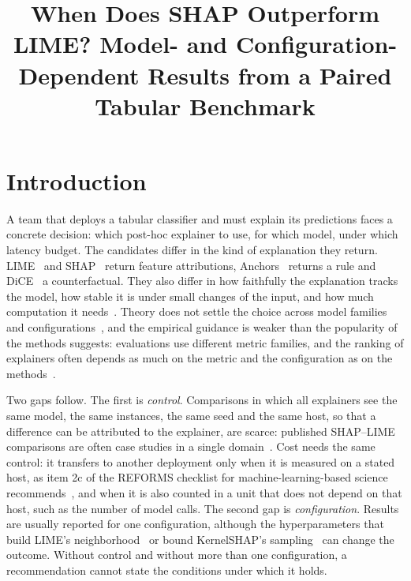 \documentclass[11pt,a4paper]{article}
\title{When Does SHAP Outperform LIME? Model- and Configuration-Dependent
Results from a Paired Tabular Benchmark}
\author{}
\date{}
\begin{document}
\maketitle

\begin{abstract}
\noindent

\end{abstract}


\section{Introduction}
\label{sec:intro}

A team that deploys a tabular classifier and must explain its predictions
faces a concrete decision: which post-hoc explainer to use, for which model,
under which latency budget. The candidates differ in the kind of explanation
they return. LIME~\cite{ribeiro2016why} and SHAP~\cite{lundberg2017unified}
return feature attributions, Anchors~\cite{ribeiro2018anchors} returns a
rule and DiCE~\cite{mothilal2020dice} a counterfactual. They also differ in
how faithfully the explanation tracks the model, how stable it is under
small changes of the input, and how much computation it
needs~\cite{velmurugan2025guidelines,ababneh2026faithfulness,olsen2024comparative}. Theory does
not settle the choice across model families and
configurations~\cite{retzlaff2024posthoc,longo2024manifesto}, and the
empirical guidance is weaker than the popularity of the methods suggests:
evaluations use different metric families, and the ranking of explainers
often depends as much on the metric and the configuration as on the
methods~\cite{nauta2023anecdotal,canha2025benchmark,pawlicki2024metrics}.

Two gaps follow. The first is \emph{control}. Comparisons in which all
explainers see the same model, the same instances, the same seed and the
same host, so that a difference can be attributed to the explainer, are
scarce: published SHAP--LIME comparisons are often case studies in a single
domain~\cite{hooshyar2024problems,schulte2024studying}. Cost needs the same
control: it transfers to another deployment only when it is measured on a
stated host, as item 2c of the REFORMS checklist for machine-learning-based
science recommends~\cite{kapoor2024reforms}, and when it is also counted in a
unit that does not depend on that host, such as the number of model calls.
The second gap is \emph{configuration}. Results are usually reported for one
configuration, although the hyperparameters that build LIME's
neighborhood~\cite{saadatfar2024uslime} or bound KernelSHAP's
sampling~\cite{olsen2024comparative} can change the outcome. Without
control and without more than one configuration, a recommendation cannot
state the conditions under which it holds.
\end{document}
